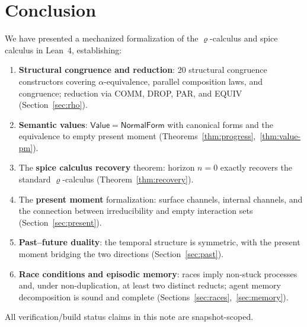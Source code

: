 \documentclass[11pt,a4paper]{article}
\theoremstyle{definition}
\theoremstyle{remark}
\renewcommand{\rho}{\varrho}
\begin{document}
\section{Conclusion}
\label{sec:conclusion}

We have presented a mechanized formalization of the $\rho$-calculus
and spice calculus in Lean~4, establishing:

\begin{enumerate}[nosep]
  \item \textbf{Structural congruence and reduction}: 20 structural congruence
    constructors covering $\alpha$-equivalence, parallel composition laws, and
    congruence; reduction via COMM, DROP, PAR, and EQUIV
    (Section~\ref{sec:rho}).
  \item \textbf{Semantic values}: $\mathsf{Value} = \mathsf{NormalForm}$ with
    canonical forms and the equivalence to empty present moment
    (Theorems~\ref{thm:progress},~\ref{thm:value-pm}).
  \item The \textbf{spice calculus recovery} theorem: horizon $n = 0$ exactly
    recovers the standard $\rho$-calculus (Theorem~\ref{thm:recovery}).
  \item The \textbf{present moment} formalization: surface channels, internal
    channels, and the connection between irreducibility and empty interaction
    sets (Section~\ref{sec:present}).
  \item \textbf{Past--future duality}: the temporal structure is symmetric,
    with the present moment bridging the two directions
    (Section~\ref{sec:past}).
  \item \textbf{Race conditions and episodic memory}: races imply
    non-stuck processes and, under non-duplication, at least two distinct
    reducts; agent memory decomposition is sound and complete
    (Sections~\ref{sec:races},~\ref{sec:memory}).
\end{enumerate}

All verification/build status claims in this note are snapshot-scoped.
\end{document}

